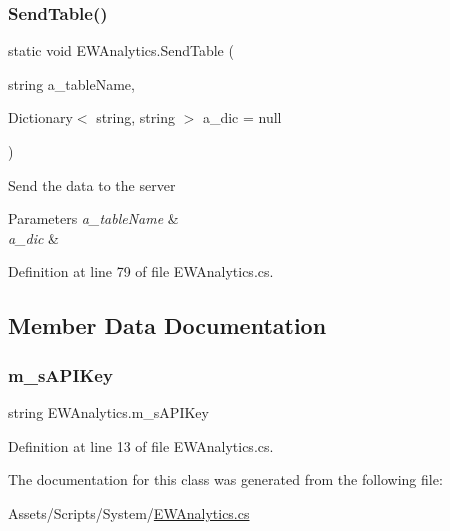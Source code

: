 \subsubsection{\texorpdfstring{Send\+Table()}{SendTable()}}
{\footnotesize\ttfamily static void E\+W\+Analytics.\+Send\+Table (\begin{DoxyParamCaption}\item[{string}]{a\+\_\+table\+Name,  }\item[{Dictionary$<$ string, string $>$}]{a\+\_\+dic = {\ttfamily null} }\end{DoxyParamCaption})\hspace{0.3cm}{\ttfamily [static]}}



Send the data to the server 


\begin{DoxyParams}{Parameters}
{\em a\+\_\+table\+Name} & \\
\hline
{\em a\+\_\+dic} & \\
\hline
\end{DoxyParams}


Definition at line 79 of file E\+W\+Analytics.\+cs.



\subsection{Member Data Documentation}
\mbox{\label{class_e_w_analytics_ab39bd84ab0c4149e5cf91e3fbf01080f}} 
\subsubsection{\texorpdfstring{m\+\_\+s\+A\+P\+I\+Key}{m\_sAPIKey}}
{\footnotesize\ttfamily string E\+W\+Analytics.\+m\+\_\+s\+A\+P\+I\+Key}



Definition at line 13 of file E\+W\+Analytics.\+cs.



The documentation for this class was generated from the following file\+:\begin{DoxyCompactItemize}
\item 
Assets/\+Scripts/\+System/\mbox{\hyperlink{_e_w_analytics_8cs}{E\+W\+Analytics.\+cs}}\end{DoxyCompactItemize}
